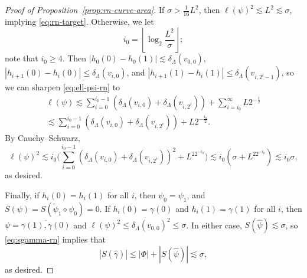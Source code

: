 \documentclass[10pt,a4paper]{amsart}
\begin{document}
\begin{proof}[Proof of Proposition~\ref{prop:rn-curve-area}]
  If $\sigma > \frac{1}{16} L^2$, then $\ell(\psi)^2 \lesssim L^2 \lesssim \sigma$, implying \eqref{eq:rn-target}. Otherwise, we let
  $$i_0=\left\lfloor \log_2 \frac{L^2}{\sigma}\right\rfloor;$$
  note that $i_0 \ge 4$.  Then $|h_0(0)-h_0(1)| \lesssim \delta_{\Lambda}(v_{0,0})$, $|h_{i+1}(0)-h_i(0)|\le \delta_{\Lambda}(v_{i,0})$, and $|h_{i+1}(1)-h_i(1)|\le \delta_{\Lambda}(v_{i,2^i-1})$, so we can sharpen \eqref{eq:ell-psi-rn} to
  \begin{multline*}
    \ell(\psi) \lesssim \sum_{i=0}^{i_0-1} \left(\delta_\Lambda(v_{i,0}) + \delta_\Lambda(v_{i,2^i})\right) + \sum_{i=i_0}^{\infty} L2^{-\frac{i}{2}}\\
    \lesssim \sum_{i=0}^{i_0-1} \left(\delta_\Lambda(v_{i,0}) + \delta_\Lambda(v_{i,2^i})\right) + L2^{-\frac{i_0}{2}}.
  \end{multline*}
  By Cauchy--Schwarz,
  $$\ell(\psi)^2 \lesssim i_0 \bigg(\sum_{i=0}^{i_0-1} \left(\delta_\Lambda(v_{i,0}) + \delta_\Lambda(v_{i,2^i})\right)^2 + L^22^{-i_0}\bigg) \lesssim
  i_0 (\sigma + L^22^{-i_0}) \lesssim i_0 \sigma,$$
  as desired.

  Finally, if $h_i(0)=h_i(1)$ for all $i$, then $\psi_0 = \psi_1$, and $S(\psi) = S(\tilde{\psi}_1 \diamond \psi_0) = 0$. If $h_i(0) = \gamma(0)$ and $h_i(1) = \gamma(1)$ for all $i$, then $\psi = \overline{\gamma(1),\gamma(0)}$ and $\ell(\psi)^2 \le \delta_\Lambda(v_{0,0})^2 \le \sigma$. In either case, $S(\hat{\psi})\lesssim \sigma$, so \eqref{eq:sgamma-rn} implies that
  $$|S(\hat\gamma)| \le |\Phi| + |S(\hat\psi)| \lesssim \sigma,$$
  as desired.
\end{proof}
\end{document}
